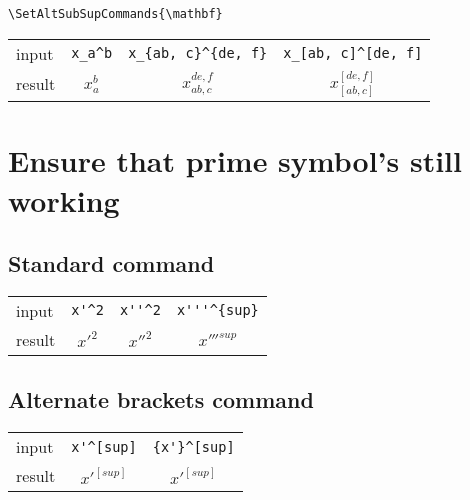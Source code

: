\documentclass{article}
\begin{document}
\begin{verbatim}
\SetAltSubSupCommands{\mathbf}
\end{verbatim}
\SetAltSubSupCommands{\mathbf}

\begin{center}
  \begin{tabular}{lccc}
    \hline
    input & \verb|x_a^b| & \verb|x_{ab, c}^{de, f}|   & \verb|x_[ab, c]^[de, f]| \\
    result & $x_a^b$ & $x_{ab, c}^{de, f}$  & $x_[ab, c]^[de, f]$ \\
    \hline
  \end{tabular}
\end{center}

\SetAltSubSupCommands{\text}

\section{Ensure that prime symbol's still working}

\subsection{Standard command}

\begin{center}
  \begin{tabular}{lccc}
    \hline
    input & \verb|x'^2| & \verb|x''^2| & \verb|x'''^{sup}| \\
    result & $x'^2$ & $x''^2$ & $x'''^{sup}$  \\
    \hline
  \end{tabular}
\end{center}

\subsection{Alternate brackets command}

\begin{center}
  \begin{tabular}{lcc}
    \hline
    input & \verb|x'^[sup]| & \verb|{x'}^[sup]| \\
    result & $x'^[sup]$ & ${x'}^[sup]$ \\
    \hline
  \end{tabular}
\end{center}
\end{document}
